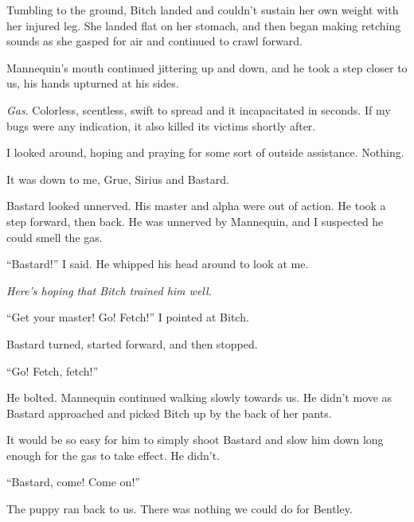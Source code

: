 Tumbling to the ground, Bitch landed and couldn't sustain her own weight with her injured leg.  She landed flat on her stomach, and then began making retching sounds as she gasped for air and continued to crawl forward.



Mannequin's mouth continued jittering up and down, and he took a step closer to us, his hands upturned at his sides.



\emph{Gas}.  Colorless, scentless, swift to spread and it incapacitated in seconds.  If my bugs were any indication, it also killed its victims shortly after.



I looked around, hoping and praying for some sort of outside assistance.  Nothing.



It was down to me, Grue, Sirius and Bastard.



Bastard looked unnerved.  His master and alpha were out of action.  He took a step forward, then back.  He was unnerved by Mannequin, and I suspected he could smell the gas.



``Bastard!'' I said.  He whipped his head around to look at me.



\emph{Here's hoping that Bitch trained him well.}



``Get your master!  Go!  Fetch!'' I pointed at Bitch.



Bastard turned, started forward, and then stopped.



``Go!  Fetch, fetch!''



He bolted.  Mannequin continued walking slowly towards us.  He didn't move as Bastard approached and picked Bitch up by the back of her pants.



It would be so easy for him to simply shoot Bastard and slow him down long enough for the gas to take effect.  He didn't.



``Bastard, come!  Come on!''



The puppy ran back to us.  There was nothing we could do for Bentley.



